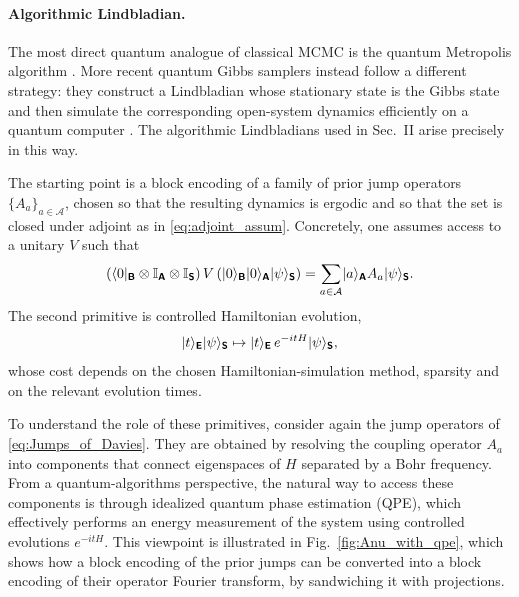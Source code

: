 \documentclass[showpacs,amsmath,amssymb,twocolumn,prx,superscriptaddress,10pt,aps,nofootinbib]{revtex4-2}
\DeclarePairedDelimiter\bra{\langle}{|}
\DeclarePairedDelimiter\ket{|}{\rangle}
\newcommand{\bbI}{\mathbb{I}}
\newcommand{\rS}{\boldsymbol{\mathsf{S}}}
\newcommand{\rE}{\boldsymbol{\mathsf{E}}}
\newcommand{\rA}{\boldsymbol{\mathsf{A}}}
\newcommand{\rB}{\boldsymbol{\mathsf{B}}}
\begin{document}

\paragraph{Algorithmic Lindbladian.}
\label{app:algorithmic_lindbladian}

The most direct quantum analogue of classical MCMC is the quantum Metropolis algorithm \cite{temme2011quantum}. More recent quantum Gibbs samplers instead follow a different strategy: they construct a Lindbladian whose stationary state is the Gibbs state and then simulate the corresponding open-system dynamics efficiently on a quantum computer \cite{chen2025efficient,Chen2023a,Chen2023b,Ding2024}. The algorithmic Lindbladians used in Sec.~II arise precisely in this way.

The starting point is a block encoding of a family of prior jump operators \(\{A_a\}_{a\in\mathcal A}\), chosen so that the resulting dynamics is ergodic and so that the set is closed under adjoint as in \eqref{eq:adjoint_assum}. Concretely, one assumes access to a unitary \(V\) such that
\begin{equation}
\label{eq:prior_jump_block_encoding}
    (\bra{0}_{\rB}\otimes \bbI_{\rA}\otimes \bbI_{\rS})\,
    V\,
    (\ket{0}_{\rB}\ket{0}_{\rA}\ket{\psi}_{\rS})
    =
    \sum_{a\in\mathcal A}\ket{a}_{\rA}A_a\ket{\psi}_{\rS}.
\end{equation}
The second primitive is controlled Hamiltonian evolution,
\begin{equation}
\label{eq:controlled_hamiltonian_evolution}
    \ket{t}_{\rE}\ket{\psi}_{\rS}
    \mapsto
    \ket{t}_{\rE}\,e^{-itH}\ket{\psi}_{\rS},
\end{equation}
whose cost depends on the chosen Hamiltonian-simulation method, sparsity and on the relevant evolution times.

To understand the role of these primitives, consider again the jump operators of \eqref{eq:Jumps_of_Davies}. They are obtained by resolving the coupling operator $A_a$ into components that connect eigenspaces of \(H\) separated by a Bohr frequency. From a quantum-algorithms perspective, the natural way to access these components is through idealized quantum phase estimation (QPE), which effectively performs an energy measurement of the system using controlled evolutions $e^{-itH}$. This viewpoint is illustrated in Fig.~\ref{fig:Anu_with_qpe}, which shows how a block encoding of the prior jumps can be converted into a block encoding of their operator Fourier transform, by sandwiching it with projections.
\end{document}
